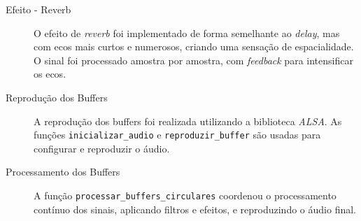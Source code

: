 \begin{description}
\item [Efeito - Reverb]

O efeito de \textit{reverb} foi implementado de forma semelhante ao \textit{delay}, mas com ecos mais curtos e numerosos, criando uma sensação de espacialidade. O sinal foi processado amostra por amostra, com \textit{feedback} para intensificar os ecos.

\item [Reprodução dos Buffers]

A reprodução dos buffers foi realizada utilizando a biblioteca \textit{ALSA}. As funções \verb|inicializar_audio| e \verb|reproduzir_buffer| são usadas para configurar e reproduzir o áudio.

\item [Processamento dos Buffers]

A função \verb|processar_buffers_circulares| coordenou o processamento contínuo dos sinais, aplicando filtros e efeitos, e reproduzindo o áudio final.
\end{description}





